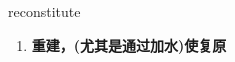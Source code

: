 
\begin{frame}
{\huge reconstitute}
\begin{center}
\begin{enumerate}\Large
  \item \textbf{重建，(尤其是通过加水)使复原}
\end{enumerate}
\end{center}
\end{frame}
